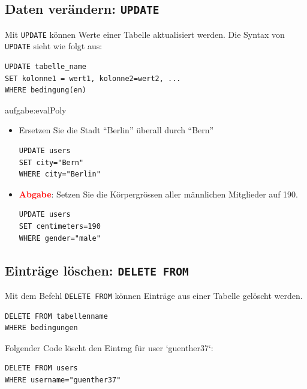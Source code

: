 \subsection{Daten verändern: \lstinline[style=sql]|UPDATE|}

Mit \lstinline[style=sql]|UPDATE| können Werte einer Tabelle aktualisiert werden. Die Syntax von \lstinline[style=sql]|UPDATE| sieht wie folgt aus:

\begin{lstlisting}[style=sql]
UPDATE tabelle_name
SET kolonne1 = wert1, kolonne2=wert2, ...
WHERE bedingung(en)
\end{lstlisting}

\begin{aufgabe}{aufgabe:evalPoly}
\begin{itemize}
\item Ersetzen Sie die Stadt ``Berlin'' überall durch ``Bern''
\begin{myantwort}
\begin{lstlisting}[style=sql]
UPDATE users
SET city="Bern"
WHERE city="Berlin"
\end{lstlisting}
\end{myantwort}
\item \textcolor{red}{\textbf{Abgabe}}: Setzen Sie die Körpergrössen aller männlichen Mitglieder auf 190.
\begin{myantwort}
\begin{lstlisting}[style=sql]
UPDATE users 
SET centimeters=190 
WHERE gender="male"
\end{lstlisting}
\end{myantwort}
\end{itemize}
\end{aufgabe}

\subsection{Einträge löschen: \lstinline[style=sql]|DELETE FROM|}
Mit dem Befehl \lstinline[style=sql]|DELETE FROM| können Einträge aus einer Tabelle gelöscht werden.
\begin{lstlisting}[style=sql]
DELETE FROM tabellenname
WHERE bedingungen
\end{lstlisting}

\begin{myexample}
Folgender Code löscht den Eintrag für user `guenther37`:
\begin{lstlisting}[style=sql]
DELETE FROM users
WHERE username="guenther37"
\end{lstlisting}
\end{myexample}


